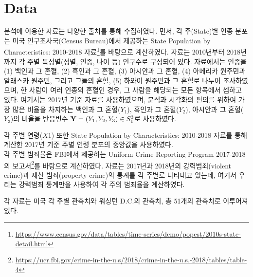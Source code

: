 \section{Data}
\label{sec:dat}


분석에 이용한 자료는 다양한 출처를 통해 수집하였다. 먼저, 각 주(State)별 인종 분포는 미국 인구조사국(Census Bureau)에서 제공하는 State Population by Characteristics: 2010-2018 자료\footnote{\url{https://www.census.gov/data/tables/time-series/demo/popest/2010s-state-detail.html}}를 바탕으로 계산하였다. 자료는 2010년부터 2018년까지 각 주별 특성별(성별, 인종, 나이 등) 인구수로 구성되어 있다. 자료에서는 인종을 (1) 백인과 그 혼혈, (2) 흑인과 그 혼혈, (3) 아시안과 그 혼혈, (4) 아메리카 원주민과 알래스카 원주민, 그리고 그들의 혼혈, (5) 하와이 원주민과 그 혼혈로 나누어 조사하였으며, 한 사람이 여러 인종의 혼혈인 경우, 그 사람을 해당되는 모든 항목에서 셈하고 있다. 여기서는 2017년 기준 자료를 사용하였으며, 분석과 시각화의 편의를 위하여 가장 많은 비율을 차지하는 백인과 그 혼혈($Y_1$), 흑인과 그 혼혈($Y_2$), 아시안과 그 혼혈($Y_3$)의 비율을 반응변수 $\mathbf{Y} = (Y_1, Y_2,Y_3) \in S_1^3$로 사용하였다.

각 주별 연령($X1$) 또한 State Population by Characteristics: 2010-2018 자료를 통해 계산한 2017년 기준 주별 연령 분포의 중앙값을 사용하였다.
\\
각 주별 범죄율은 FBI에서 제공하는 Uniform Crime Reporting Program 2017-2018의 보고서\footnote{\url{https://ucr.fbi.gov/crime-in-the-u.s/2018/crime-in-the-u.s.-2018/tables/table-4}}를 바탕으로 계산하였다. 자료는 2017년과 2018년의 강력범죄(violent crime)과 재산 범죄(property crime)의 통계를 각 주별로 나타내고 있는데, 여기서 우리는 강력범죄 통계만을 사용하여 각 주의 범죄율을 계산하였다.



각 자료는 미국 각 주별 관측치와 워싱턴 D.C.의 관측치, 총 51개의 관측치로 이루어져 있다.
